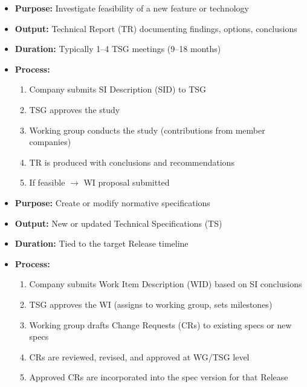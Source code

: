 
\CNchained{}



\begin{itemize}
\tightlist
\item
  \textbf{Purpose:} Investigate feasibility of a new feature or technology
\item
  \textbf{Output:} Technical Report (TR) documenting findings, options, conclusions
\item
  \textbf{Duration:} Typically 1–4 TSG meetings (9–18 months)
\item
  \textbf{Process:}

  \begin{enumerate}
  \def\labelenumi{\arabic{enumi}.}
  \tightlist
  \item
    Company submits SI Description (SID) to TSG
  \item
    TSG approves the study
  \item
    Working group conducts the study (contributions from member companies)
  \item
    TR is produced with conclusions and recommendations
  \item
    If feasible \ensuremath{\to} WI proposal submitted
  \end{enumerate}
\end{itemize}


\begin{itemize}
\tightlist
\item
  \textbf{Purpose:} Create or modify normative specifications
\item
  \textbf{Output:} New or updated Technical Specifications (TS)
\item
  \textbf{Duration:} Tied to the target Release timeline
\item
  \textbf{Process:}

  \begin{enumerate}
  \def\labelenumi{\arabic{enumi}.}
  \tightlist
  \item
    Company submits Work Item Description (WID) based on SI conclusions
  \item
    TSG approves the WI (assigns to working group, sets milestones)
  \item
    Working group drafts Change Requests (CRs) to existing specs or new specs
  \item
    CRs are reviewed, revised, and approved at WG/\allowbreak{}TSG level
  \item
    Approved CRs are incorporated into the spec version for that Release
  \end{enumerate}
\end{itemize}

